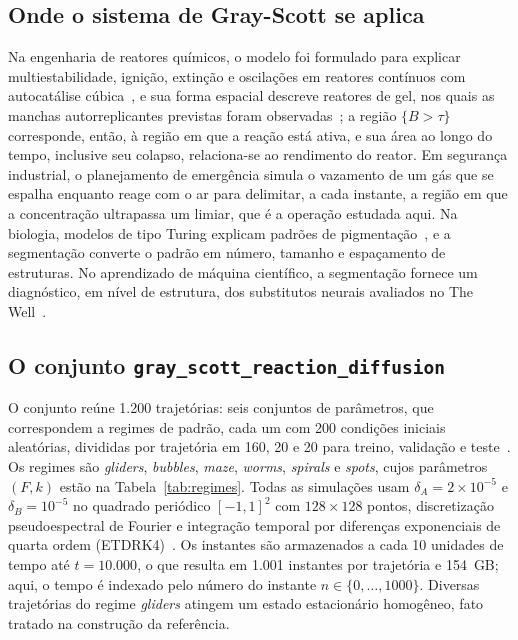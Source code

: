 \documentclass[final,5p,times,twocolumn]{elsarticle}
\begin{document}
\subsection{Onde o sistema de Gray-Scott se aplica}\label{subsec:applications}

Na engenharia de reatores químicos, o modelo foi formulado para explicar multiestabilidade, ignição, extinção e oscilações em reatores contínuos com autocatálise cúbica~\cite{gray1983,gray1984}, e sua forma espacial descreve reatores de gel, nos quais as manchas autorreplicantes previstas foram observadas~\cite{lee1993}; a região $\{B>\tau\}$ corresponde, então, à região em que a reação está ativa, e sua área ao longo do tempo, inclusive seu colapso, relaciona-se ao rendimento do reator. Em segurança industrial, o planejamento de emergência simula o vazamento de um gás que se espalha enquanto reage com o ar para delimitar, a cada instante, a região em que a concentração ultrapassa um limiar, que é a operação estudada aqui. Na biologia, modelos de tipo Turing explicam padrões de pigmentação~\cite{kondo2010,murray2003}, e a segmentação converte o padrão em número, tamanho e espaçamento de estruturas. No aprendizado de máquina científico, a segmentação fornece um diagnóstico, em nível de estrutura, dos substitutos neurais avaliados no The Well~\cite{ohana2024well}.

\subsection{O conjunto \texttt{gray\_scott\_reaction\_diffusion}}\label{subsec:dataset}

O conjunto reúne 1.200 trajetórias: seis conjuntos de parâmetros, que correspondem a regimes de padrão, cada um com 200 condições iniciais aleatórias, divididas por trajetória em 160, 20 e 20 para treino, validação e teste~\cite{ohana2024well}. Os regimes são \textit{gliders}, \textit{bubbles}, \textit{maze}, \textit{worms}, \textit{spirals} e \textit{spots}, cujos parâmetros $(F,k)$ estão na Tabela~\ref{tab:regimes}. Todas as simulações usam $\delta_A=2\times10^{-5}$ e $\delta_B=10^{-5}$ no quadrado periódico $[-1,1]^2$ com $128\times128$ pontos, discretização pseudoespectral de Fourier e integração temporal por diferenças exponenciais de quarta ordem (ETDRK4)~\cite{cox2002,kassam2005}. Os instantes são armazenados a cada 10 unidades de tempo até $t=10.000$, o que resulta em 1.001 instantes por trajetória e 154~GB; aqui, o tempo é indexado pelo número do instante $n\in\{0,\dots,1000\}$. Diversas trajetórias do regime \textit{gliders} atingem um estado estacionário homogêneo, fato tratado na construção da referência.
\end{document}
